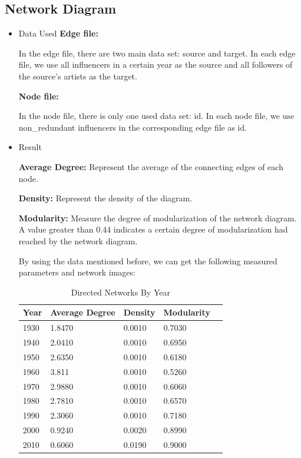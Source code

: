 \documentclass[12pt]{article}
\begin{document}
\subsection{Network Diagram}
\begin{itemize}
\item Data Used
\textbf{Edge file:}

In the edge file, there are two main data set: source and target. In each edge file, we use all influencers in a certain year as the source and all followers of the source's artists as the target.

\textbf{Node file:}

In the node file, there is only one used data set: id. In each node file, we use non\_redundant influencers in the corresponding edge file as id.


\item Result

\textbf{Average Degree:} Represent the average of the connecting edges of each node.

\textbf{Density:} Represent the density of the diagram.

\textbf{Modularity:} Measure the degree of modularization of the network diagram. A value greater than 0.44 indicates a certain degree of modularization had reached by the network diagram.


By using the data mentioned before, we can get the following measured parameters and network images:

\begin{table} [H] 
\begin{center}
\begin{tabular}{p{80pt}p{80pt}p{80pt}p{80pt}p{80pt}}
\toprule
Year & Average Degree & Density & Modularity\\
\midrule
1930 & 1.8470 & 0.0010 & 0.7030\\
1940 & 2.0410 & 0.0010 & 0.6950\\
1950 & 2.6350 & 0.0010 & 0.6180\\
1960 & 3.811 & 0.0010 & 0.5260\\
1970 & 2.9880 &	0.0010 & 0.6060\\
1980 & 2.7810 &	0.0010 & 0.6570\\
1990 & 2.3060 &	0.0010 & 0.7180\\
2000 & 0.9240 &	0.0020 & 0.8990\\
2010 & 0.6060 &	0.0190 & 0.9000\\
\bottomrule
\end{tabular}
\end{center}
\caption{Directed Networks By Year}
\label{Directed Networks By Year}
\end{table}


\end{itemize}
\end{document}
